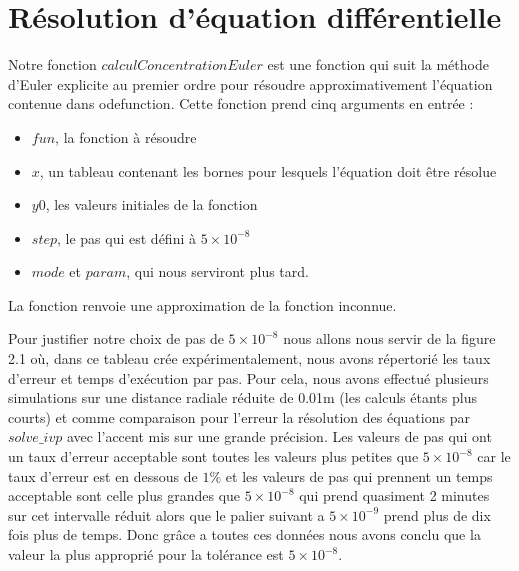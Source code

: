 \documentclass[11pt]{report}
\begin{document}
        \section{Résolution d'équation différentielle}
            Notre fonction $calculConcentrationEuler$ est une fonction qui suit la méthode d'Euler explicite au premier ordre
            pour résoudre approximativement l'équation contenue dans odefunction.
            Cette fonction prend cinq arguments en entrée :
            \begin{itemize}
                \item $fun$, la fonction à résoudre
                \item $x$, un tableau contenant les bornes pour lesquels l'équation doit être résolue
                \item $y0$, les valeurs initiales de la fonction
                \item $step$, le pas qui est défini à $5\times10^{-8}$
                \item $mode$ et $param$, qui nous serviront plus tard.
            \end{itemize}
            La fonction renvoie une approximation de la fonction inconnue.
            \par
            Pour justifier notre choix de pas de $5\times10^{-8}$ nous allons nous servir de la figure 2.1
            où, dans ce tableau crée expérimentalement, nous avons répertorié les taux d'erreur et temps d'exécution par pas.
            Pour cela, nous avons effectué plusieurs simulations sur une distance radiale réduite de 0.01m (les calculs étants plus courts)
            et comme comparaison pour l'erreur la résolution des équations par $solve\_ivp$ avec l'accent mis sur une grande précision. Les
            valeurs de pas qui ont un taux d'erreur acceptable sont toutes les valeurs plus petites que $5\times10^{-8}$
            car le taux d'erreur est en dessous de $1\%$ et les valeurs de pas qui prennent
            un temps acceptable sont celle plus grandes que $5\times10^{-8}$ qui prend quasiment 2 minutes sur cet
            intervalle réduit alors que le palier suivant a $5\times10^{-9}$ prend plus de dix fois plus de temps.
            Donc grâce a toutes ces données nous avons conclu que la valeur la plus approprié pour la
            tolérance est $5\times10^{-8}$.
            \par
\end{document}
